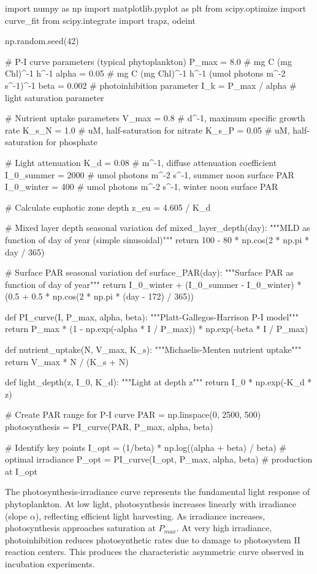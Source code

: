 \documentclass[a4paper, 11pt]{article}
\begin{document}
\begin{pycode}
import numpy as np
import matplotlib.pyplot as plt
from scipy.optimize import curve_fit
from scipy.integrate import trapz, odeint

np.random.seed(42)

# P-I curve parameters (typical phytoplankton)
P_max = 8.0  # mg C (mg Chl)^-1 h^-1
alpha = 0.05  # mg C (mg Chl)^-1 h^-1 (umol photons m^-2 s^-1)^-1
beta = 0.002  # photoinhibition parameter
I_k = P_max / alpha  # light saturation parameter

# Nutrient uptake parameters
V_max = 0.8  # d^-1, maximum specific growth rate
K_s_N = 1.0  # uM, half-saturation for nitrate
K_s_P = 0.05  # uM, half-saturation for phosphate

# Light attenuation
K_d = 0.08  # m^-1, diffuse attenuation coefficient
I_0_summer = 2000  # umol photons m^-2 s^-1, summer noon surface PAR
I_0_winter = 400  # umol photons m^-2 s^-1, winter noon surface PAR

# Calculate euphotic zone depth
z_eu = 4.605 / K_d

# Mixed layer depth seasonal variation
def mixed_layer_depth(day):
    """MLD as function of day of year (simple sinusoidal)"""
    return 100 - 80 * np.cos(2 * np.pi * day / 365)

# Surface PAR seasonal variation
def surface_PAR(day):
    """Surface PAR as function of day of year"""
    return I_0_winter + (I_0_summer - I_0_winter) * (0.5 + 0.5 * np.cos(2 * np.pi * (day - 172) / 365))

def PI_curve(I, P_max, alpha, beta):
    """Platt-Gallegos-Harrison P-I model"""
    return P_max * (1 - np.exp(-alpha * I / P_max)) * np.exp(-beta * I / P_max)

def nutrient_uptake(N, V_max, K_s):
    """Michaelis-Menten nutrient uptake"""
    return V_max * N / (K_s + N)

def light_depth(z, I_0, K_d):
    """Light at depth z"""
    return I_0 * np.exp(-K_d * z)

# Create PAR range for P-I curve
PAR = np.linspace(0, 2500, 500)
photosynthesis = PI_curve(PAR, P_max, alpha, beta)

# Identify key points
I_opt = (1/beta) * np.log((alpha + beta) / beta)  # optimal irradiance
P_opt = PI_curve(I_opt, P_max, alpha, beta)  # production at I_opt

\end{pycode}

The photosynthesis-irradiance curve represents the fundamental light response of phytoplankton.
At low light, photosynthesis increases linearly with irradiance (slope $\alpha$), reflecting
efficient light harvesting. As irradiance increases, photosynthesis approaches saturation at
$P_{max}$. At very high irradiance, photoinhibition reduces photosynthetic rates due to damage
to photosystem II reaction centers. This produces the characteristic asymmetric curve observed
in incubation experiments.
\end{document}
